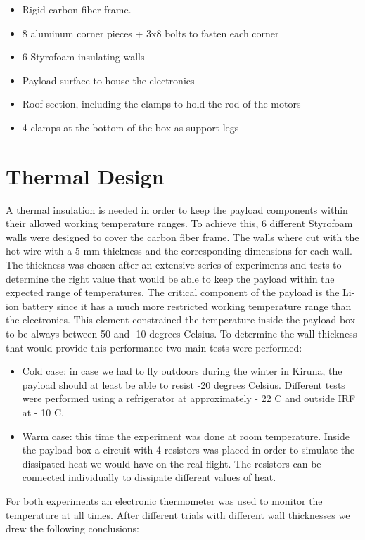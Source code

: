 \begin{itemize}
\item Rigid carbon fiber frame.
\item 8 aluminum corner pieces + 3x8 bolts to fasten each corner
\item 6 Styrofoam insulating walls
\item Payload surface to house the electronics
\item Roof section, including the clamps to hold the rod of the motors
\item 4 clamps at the bottom of the box as support legs
\end{itemize}

\section{Thermal Design}
A thermal insulation is needed in order to keep the payload components within their allowed working temperature ranges. To achieve this, 6 different Styrofoam walls were designed to cover the carbon fiber frame. The walls where cut with the hot wire with a 5 mm thickness and the corresponding dimensions for each wall. 
The thickness was chosen after an extensive series of experiments and tests to determine the right value that would be able to keep the payload within the expected range of temperatures. The critical component of the payload is the Li-ion battery since it has a much more restricted working temperature range than the electronics. This element constrained the temperature inside the payload box to be always between 50 and -10 degrees Celsius.  To determine the wall thickness that would provide this performance two main tests were performed:

\begin{itemize}
\item Cold case: in case we had to fly outdoors during the winter in Kiruna, the payload should at least be able to resist -20 degrees Celsius. Different tests were performed using a refrigerator at approximately - 22 C and outside IRF at - 10 C. 
\item Warm case: this time the experiment was done at room temperature. Inside the payload box a circuit with 4 resistors was placed in order to simulate the dissipated heat we would have on the real flight. The resistors can be connected individually to dissipate different values of heat. 
\end{itemize}

For both experiments an electronic thermometer was used to monitor the temperature at all times. After different trials with different wall thicknesses we drew the following conclusions:

